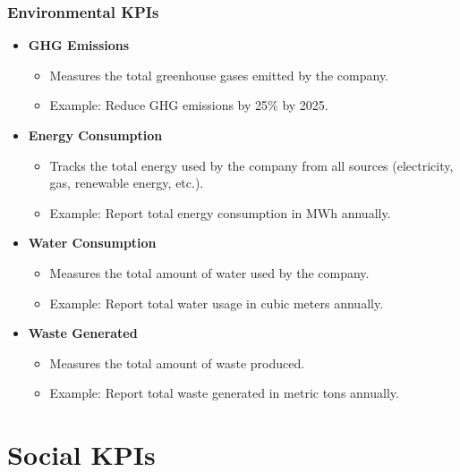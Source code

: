 \documentclass{beamer}
\begin{document}
\begin{frame}
\frametitle{Environmental KPIs}
\begin{itemize}
    \item \textbf{GHG Emissions}
        \begin{itemize}
            \item Measures the total greenhouse gases emitted by the company.
            \item Example: Reduce GHG emissions by 25\% by 2025.
        \end{itemize}
    \item \textbf{Energy Consumption}
        \begin{itemize}
            \item Tracks the total energy used by the company from all sources (electricity, gas, renewable energy, etc.).
            \item Example: Report total energy consumption in MWh annually.
        \end{itemize}
    \item \textbf{Water Consumption}
        \begin{itemize}
            \item Measures the total amount of water used by the company.
            \item Example: Report total water usage in cubic meters annually.
        \end{itemize}
    \item \textbf{Waste Generated}
        \begin{itemize}
            \item Measures the total amount of waste produced.
            \item Example: Report total waste generated in metric tons annually.
        \end{itemize}
\end{itemize}
\end{frame}

\section{Social KPIs}
\end{document}
